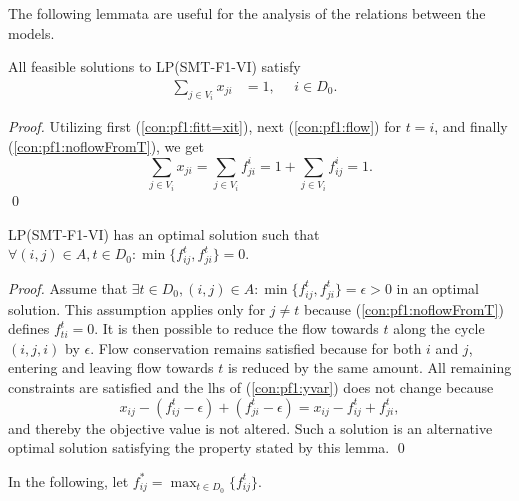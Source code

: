The following lemmata are useful for the analysis of the relations between the models. 
\begin{lemma}\label{lem:sumxji1}
All feasible solutions to LP(SMT-F1-VI) satisfy
\begin{align}
\sum_{j\in V_i}x_{ji}&=1,~~~~~~ i\in D_0. & \label{eq:sumToD} 
\end{align}
\end{lemma}
\begin{proof}
 Utilizing first (\ref{con:pf1:fitt=xit}), next (\ref{con:pf1:flow}) for $t=i$, and finally (\ref{con:pf1:noflowFromT}), we get
$$\sum_{j\in V_i}x_{ji}=\sum_{j\in V_i}f_{ji}^i = 1+\sum_{j\in V_i}f_{ij}^i=1.$$\qed
\end{proof}
\begin{lemma}\label{lem:onedir} LP(SMT-F1-VI) has an optimal solution such that \newline
$\forall (i,j)\in A, t\in D_0: \min\{f_{ij}^t,f_{ji}^t\} = 0.$
\end{lemma}
\begin{proof}
Assume that $\exists t\in D_0, (i,j)\in A: \min\{f_{ij}^t,f_{ji}^t\} = \epsilon> 0$ in an optimal solution. This assumption applies only for $j\neq t$ because (\ref{con:pf1:noflowFromT}) defines $f^t_{ti}=0$.  It is then possible to reduce the flow towards $t$ along the cycle $(i,j,i)$ by $\epsilon$. Flow conservation remains satisfied because for both $i$ and $j$, entering and leaving flow towards $t$ is reduced by the same amount. All remaining constraints are satisfied and the lhs of (\ref{con:pf1:yvar}) does not change because 
$$
x_{ij}-(f_{ij}^t-\epsilon)+(f_{ji}^t-\epsilon) = x_{ij}-f_{ij}^t+f_{ji}^t,
$$
and thereby the objective value is not altered. Such a solution is an alternative optimal solution satisfying the property stated by this lemma.  \qed
\end{proof}
In the following, let $f^*_{ij}=\max_{t\in D_0}\{f^t_{ij}\}$.
